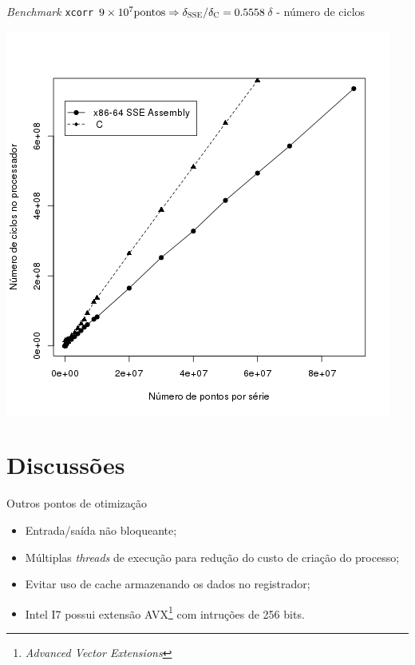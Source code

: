 \documentclass[]{beamer}
\begin{document}
\begin{frame}{{\em Benchmark} \tt xcorr}
  \small
  $9\times 10^7\text{pontos} \Rightarrow  \delta_\text{\sc SSE}/\delta_\text{\sc
    C} = 0.5558$\hfill {\scriptsize $\delta$ - número de ciclos}
\begin{center}
    \includegraphics[scale=.425]{xcorr-bench.png}
  \end{center}
\end{frame}


\section{Discussões}

\begin{frame}{Outros pontos de otimização}

  \begin{itemize}
  \item Entrada/saída não bloqueante;
  \item Múltiplas {\em threads} de execução para redução do custo de
    criação do processo;
  \item Evitar uso de cache armazenando os dados no registrador;
  \item Intel I7 possui extensão AVX\footnote{\em Advanced Vector
      Extensions} com intruções de 256 bits.
  \end{itemize}
  
\end{frame}
\end{document}

